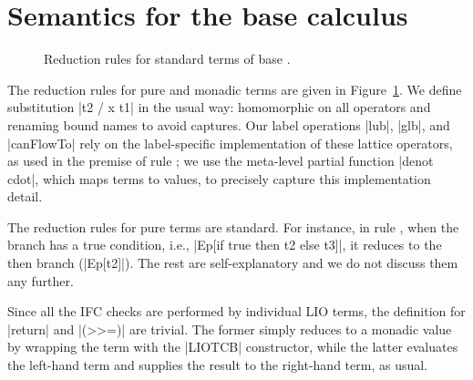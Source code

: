\appendices
\section{Semantics for the base calculus}
\label{sec:app:sem}

\begin{figure}[b] %
\small
{}
\caption{Reduction rules for standard terms of base \lio.\label{fig:sos:rules}}
\end{figure}


The reduction rules for pure and monadic terms are given in
Figure~\ref{fig:sos:rules}. 
% 
We define substitution |{t2 / x } t1| in the
usual way: homomorphic on all operators and renaming bound names to avoid
captures.
%
Our label operations |lub|, |glb|, and |canFlowTo| rely on the label-specific
implementation of these lattice operators, as used in the premise of rule
; we use the meta-level partial function |denot cdot|, which
maps terms to values, to precisely capture this implementation detail.

%
The reduction rules for pure terms are standard. For instance, in rule
, when the branch has a true condition, i.e., |Ep[if
true then t2 else t3]|, it reduces to the then branch (|Ep[t2]|).  The
rest are self-explanatory and we do not discuss them any further. 
%

%
%
Since all the IFC checks are performed by individual LIO terms, the
definition for |return| and |(>>=)| are trivial.
The former simply reduces to a monadic value by wrapping the term with
the |LIOTCB| constructor, while the latter evaluates the left-hand
term and supplies the result to the right-hand term, as usual.


